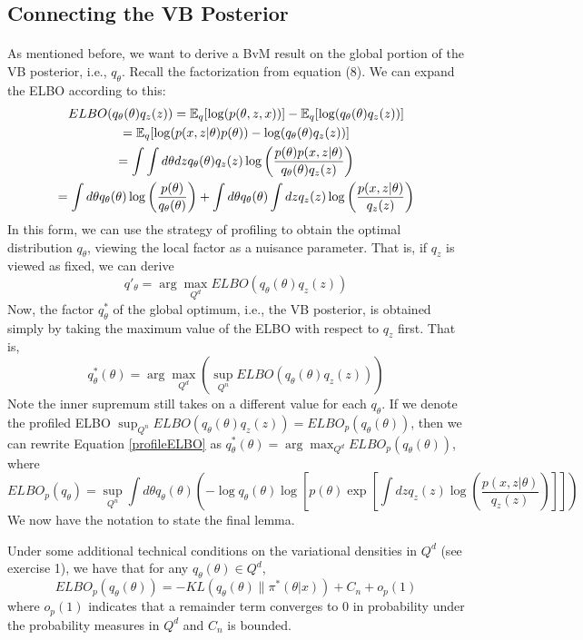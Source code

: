 \subsection{Connecting the VB Posterior}

\paragraph{} As mentioned before, we want to derive a BvM result on the global portion of the VB posterior, i.e., $q_{\theta}$. Recall the factorization from equation (8). We can expand the ELBO according to this:
\begin{gather*}
ELBO(q_\theta(\theta)q_z(z)) = \mathbb{E}_q[\log(p(\theta,z,x))] - \mathbb{E}_q[\log(q_{\theta}(\theta)q_z(z))] \\
= \mathbb{E}_{q}[\log(p(x, z|\theta)p(\theta)) - \log(q_{\theta}(\theta)q_z(z))] \\
= \int\int d\theta dz q_\theta(\theta)q_z(z) \log \left( \frac{p(\theta) p(x, z|\theta)}{q_{\theta}(\theta)q_z(z)} \right) \\
= \int d\theta q_{\theta}(\theta) \log \left(\frac{p(\theta)}{q_{\theta}(\theta)} \right) + \int d\theta q_{\theta}(\theta) \int dz q_z(z)\log \left(\frac{p(x,z|\theta)}{q_z(z)} \right)
\end{gather*}
In this form, we can use the strategy of profiling to obtain the optimal distribution $q_{\theta}$, viewing the local factor as a nuisance parameter. That is, if $q_z$ is viewed as fixed, we can derive
$$
q'_{\theta} = \arg\max_{Q^d} ELBO(q_{\theta}(\theta)q_z(z))
$$
%
Now, the factor $q^*_{\theta}$ of the global optimum, i.e., the VB posterior, is obtained simply by taking the maximum value of the ELBO with respect to $q_z$ first. That is,
\begin{equation}
\label{profileELBO}
q_{\theta}^*(\theta) = \arg \max_{Q^d} \left(\sup_{Q^n} ELBO(q_{\theta}(\theta)q_z(z)) \right)
\end{equation}
%
Note the inner supremum still takes on a different value for each $q_{\theta}$. If we denote the profiled ELBO $\sup_{Q^n} ELBO(q_{\theta}(\theta)q_z(z)) = ELBO_p(q_{\theta}(\theta))$, then we can rewrite Equation \ref{profileELBO} as $q_{\theta}^*(\theta) = \arg \max_{Q^d} ELBO_p(q_{\theta}(\theta))$, where
\begin{equation}
ELBO_p(q_{\theta}) = \sup_{Q^n} \int d\theta q_{\theta}(\theta) \left(- \log q_\theta(\theta) \log \left[ p(\theta) \exp \left[ \int dz q_{z}(z) \log\left( \frac{p(x,z|\theta)}{q_z(z)} \right)\right] \right] \right)
\end{equation}
We now have the notation to state the final lemma. 
\begin{lemma}
	\label{lem4}
	Under some additional technical conditions on the variational densities in $Q^d$ (see exercise 1), we have that for any $q_{\theta}(\theta) \in Q^d$, 
	\begin{equation*}
	ELBO_p(q_{\theta}(\theta)) = -KL(q_{\theta}(\theta)\| \pi^*(\theta|x)) + C_n + o_p(1)
	\end{equation*}
	where $o_p(1)$ indicates that a remainder term converges to $0$ in probability under the probability measures in $Q^d$ and $C_n$ is bounded. 
\end{lemma}

